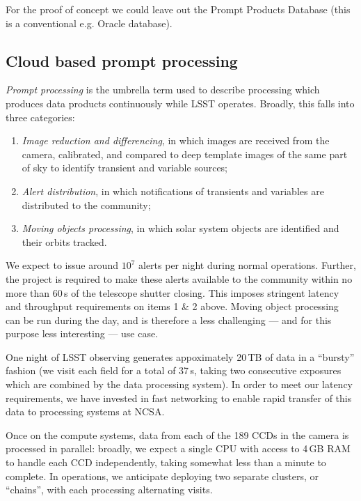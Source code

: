 For the proof of concept we could leave out the Prompt Products Database (this is a conventional e.g. Oracle database).

\subsection{Cloud based prompt processing}\label{sect:pp}

\textit{Prompt processing}  is the umbrella term used to describe processing which produces data products continuously while LSST operates.
Broadly, this falls into three categories:

\begin{enumerate}

\item{\textit{Image reduction and differencing}, in which images are received from the camera, calibrated, and compared to deep template images of the same part of sky to identify transient and variable sources;}
\item{\textit{Alert distribution}, in which notifications of transients and variables are distributed to the community;}
\item{\textit{Moving objects processing}, in which solar system objects are identified and their orbits tracked.}

\end{enumerate}

We expect to issue around $10^7$ alerts per night during normal operations.
Further, the project is required to make these alerts available to the community within no more than 60\,s of the telescope shutter closing.
This imposes stringent latency and throughput requirements on items 1 \& 2 above.
Moving object processing can be run during the day, and is therefore a less challenging — and for this purpose less interesting — use case.

One night of LSST observing generates appoximately 20\,TB of data in a ``bursty'' fashion (we visit each field for a total of 37\,s, taking two consecutive exposures which are combined by the data processing system).
In order to meet our latency requirements, we have invested in fast networking to enable rapid transfer of this data to processing systems at NCSA.

Once on the compute systems, data from each of the 189 CCDs in the camera is processed in parallel: broadly, we expect a single CPU with access to 4\,GB RAM to handle each CCD independently, taking somewhat less than a minute to complete.
In operations, we anticipate deploying two separate clusters, or ``chains'', with each processing alternating visits.

